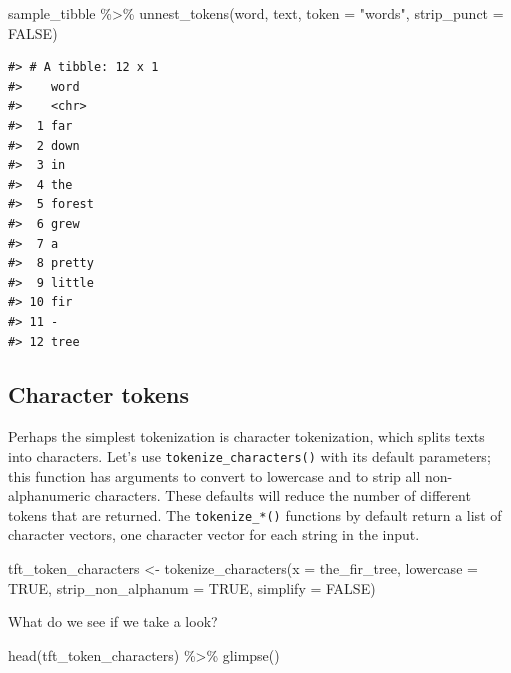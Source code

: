 \documentclass[
]{krantz}
\makeatletter
\newenvironment{Shaded}{\begin{snugshade}}{\end{snugshade}}
\newcommand{\AttributeTok}[1]{\textcolor[rgb]{0.77,0.63,0.00}{#1}}
\newcommand{\ConstantTok}[1]{\textcolor[rgb]{0.00,0.00,0.00}{#1}}
\newcommand{\FunctionTok}[1]{\textcolor[rgb]{0.00,0.00,0.00}{#1}}
\newcommand{\NormalTok}[1]{#1}
\newcommand{\OtherTok}[1]{\textcolor[rgb]{0.56,0.35,0.01}{#1}}
\newcommand{\SpecialCharTok}[1]{\textcolor[rgb]{0.00,0.00,0.00}{#1}}
\newcommand{\StringTok}[1]{\textcolor[rgb]{0.31,0.60,0.02}{#1}}
\newenvironment{kframe}{%
\medskip{}
\setlength{\fboxsep}{.8em}
 \def\at@end@of@kframe{}%
 \ifinner\ifhmode%
  \def\at@end@of@kframe{\end{minipage}}%
  \begin{minipage}{\columnwidth}%
 \fi\fi%
 \def\FrameCommand##1{\hskip\@totalleftmargin \hskip-\fboxsep
 \colorbox{shadecolor}{##1}\hskip-\fboxsep
     \hskip-\linewidth \hskip-\@totalleftmargin \hskip\columnwidth}%
 \MakeFramed {\advance\hsize-\width
   \@totalleftmargin\z@ \linewidth\hsize
   \@setminipage}}%
 {\par\unskip\endMakeFramed%
 \at@end@of@kframe}
\renewenvironment{Shaded}{\begin{kframe}}{\end{kframe}}
\makeatother
\begin{document}
\begin{Shaded}
\begin{Highlighting}[]
\NormalTok{sample\_tibble }\SpecialCharTok{\%\textgreater{}\%}
  \FunctionTok{unnest\_tokens}\NormalTok{(word, text, }\AttributeTok{token =} \StringTok{"words"}\NormalTok{, }\AttributeTok{strip\_punct =} \ConstantTok{FALSE}\NormalTok{)}
\end{Highlighting}
\end{Shaded}

\begin{verbatim}
#> # A tibble: 12 x 1
#>    word  
#>    <chr> 
#>  1 far   
#>  2 down  
#>  3 in    
#>  4 the   
#>  5 forest
#>  6 grew  
#>  7 a     
#>  8 pretty
#>  9 little
#> 10 fir   
#> 11 -     
#> 12 tree
\end{verbatim}

\hypertarget{character-tokens}{%
\subsection{Character tokens}\label{character-tokens}}

Perhaps the simplest tokenization is character tokenization, which splits texts into characters. Let's use \texttt{tokenize\_characters()} with its default parameters; this function has arguments to convert to lowercase and to strip all non-alphanumeric characters. These defaults will reduce the number of different tokens that are returned. The \texttt{tokenize\_*()} functions by default return a list of character vectors, one character vector for each string in the input.

\begin{Shaded}
\begin{Highlighting}[]
\NormalTok{tft\_token\_characters }\OtherTok{\textless{}{-}} \FunctionTok{tokenize\_characters}\NormalTok{(}\AttributeTok{x =}\NormalTok{ the\_fir\_tree,}
                                            \AttributeTok{lowercase =} \ConstantTok{TRUE}\NormalTok{,}
                                            \AttributeTok{strip\_non\_alphanum =} \ConstantTok{TRUE}\NormalTok{,}
                                            \AttributeTok{simplify =} \ConstantTok{FALSE}\NormalTok{)}
\end{Highlighting}
\end{Shaded}

What do we see if we take a look?

\begin{Shaded}
\begin{Highlighting}[]
\FunctionTok{head}\NormalTok{(tft\_token\_characters) }\SpecialCharTok{\%\textgreater{}\%}
  \FunctionTok{glimpse}\NormalTok{()}
\end{Highlighting}
\end{Shaded}
\end{document}
